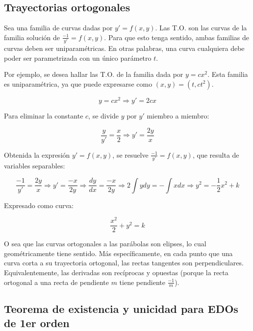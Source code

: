 \documentclass{article}
\begin{document}
\subsection{Trayectorias ortogonales}

Sea una familia de curvas dadas por $y' = f(x,y)$. Las T.O. son las curvas de la familia solución de $\frac{-1}{y'} = f(x,y)$. Para que esto tenga sentido, ambas familias de curvas deben ser uniparamétricas. En otras palabras, una curva cualquiera debe poder ser parametrizada con un único parámetro $t$.

Por ejemplo, se desea hallar las T.O. de la familia dada por $y = c x^2$. Esta familia es uniparamétrica, ya que puede expresarse como $(x, y) = (t, c t^2)$.

\begin{equation}
y = c x^2 \Rightarrow y' = 2 c x
\end{equation}

Para eliminar la constante $c$, se divide $y$ por $y'$ miembro a miembro:

\begin{equation}
\frac{y}{y'} = \frac{x}{2} \Rightarrow y' = \frac{2y}{x}
\end{equation}

Obtenida la expresión $y' = f(x,y)$, se resuelve $\frac{-1}{y'} = f(x,y)$, que resulta de variables separables:

\begin{equation}
\frac{-1}{y'} = \frac{2y}{x} \Rightarrow y' = \frac{-x}{2y} \Rightarrow \frac{dy}{dx} = \frac{-x}{2y} \Rightarrow 2 \int y dy = -\int x dx \Rightarrow y^2 = -\frac{1}{2} x^2 + k
\end{equation}

Expresado como curva:

\begin{equation}
\frac{x^2}{2} + y^2 = k
\end{equation}

O sea que las curvas ortogonales a las parábolas son elipses, lo cual geométricamente tiene sentido. Más específicamente, en cada punto que una curva corta a su trayectoria ortogonal, las rectas tangentes son perpendiculares. Equivalentemente, las derivadas son recíprocas y opuestas (porque la recta ortogonal a una recta de pendiente $m$ tiene pendiente $\frac{-1}{m}$).

\subsection{Teorema de existencia y unicidad para EDOs de 1er orden}
\end{document}
